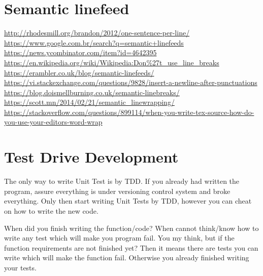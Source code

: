     \section{Semantic linefeed}

    \url{http://rhodesmill.org/brandon/2012/one-sentence-per-line/}
    \url{https://www.google.com.br/search?q=semantic+linefeeds}
    \url{https://news.ycombinator.com/item?id=4642395}
    \url{https://en.wikipedia.org/wiki/Wikipedia:Don%27t_use_line_breaks}
    \url{https://erambler.co.uk/blog/semantic-linefeeds/}
    \url{https://vi.stackexchange.com/questions/9828/insert-a-newline-after-punctuations}
    \url{https://blog.doismellburning.co.uk/semantic-linebreaks/}
    \url{https://scott.mn/2014/02/21/semantic_linewrapping/}
    \url{https://stackoverflow.com/questions/899114/when-you-write-tex-source-how-do-you-use-your-editors-word-wrap}



    \section{Test Drive Development}

    The only way to write Unit Test is by TDD.
    If you already had written the program,
    assure everything is under versioning control system and broke everything.
    Only then start writing Unit Tests by TDD,
    however you can cheat on how to write the new code.

    When did you finish writing the function/code? When cannot think/know how to write
    any test which will make you program fail.
    You my think,
    but if the function requirements are not finished yet? Then it means there are
    tests you can write which will make the function fail.
    Otherwise you already finished writing your tests.



